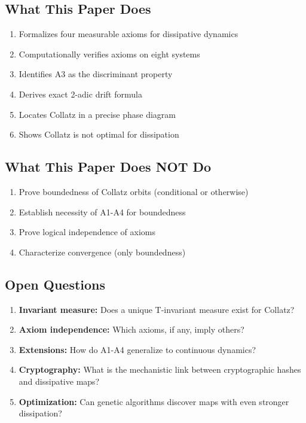 \documentclass[11pt,a4paper]{article}
\theoremstyle{plain}
\theoremstyle{definition}
\theoremstyle{remark}
\begin{document}
\subsection{What This Paper Does}

\begin{enumerate}
    \item Formalizes four measurable axioms for dissipative dynamics
    \item Computationally verifies axioms on eight systems
    \item Identifies A3 as the discriminant property
    \item Derives exact 2-adic drift formula
    \item Locates Collatz in a precise phase diagram
    \item Shows Collatz is not optimal for dissipation
\end{enumerate}

\subsection{What This Paper Does NOT Do}

\begin{enumerate}
    \item Prove boundedness of Collatz orbits (conditional or otherwise)
    \item Establish necessity of A1-A4 for boundedness
    \item Prove logical independence of axioms
    \item Characterize convergence (only boundedness)
\end{enumerate}

\subsection{Open Questions}

\begin{enumerate}
    \item \textbf{Invariant measure:} Does a unique T-invariant measure exist for Collatz?
    \item \textbf{Axiom independence:} Which axioms, if any, imply others?
    \item \textbf{Extensions:} How do A1-A4 generalize to continuous dynamics?
    \item \textbf{Cryptography:} What is the mechanistic link between cryptographic hashes and dissipative maps?
    \item \textbf{Optimization:} Can genetic algorithms discover maps with even stronger dissipation?
\end{enumerate}
\end{document}
